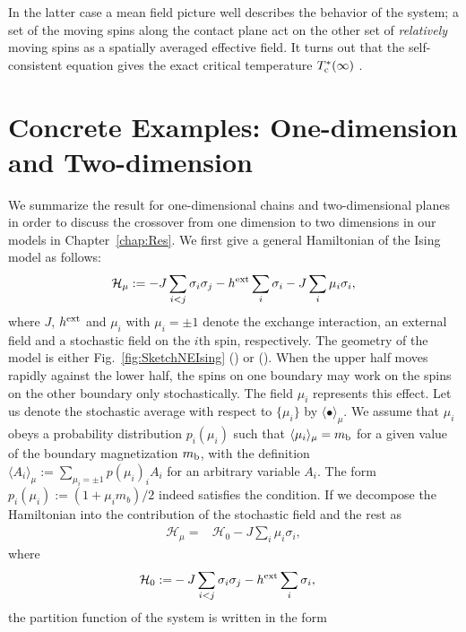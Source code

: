 In the latter case a mean field picture \cite{Hucht2009b} well describes the behavior of the system; a set of the moving spins along the contact plane act on the other set of \textit{relatively} moving spins as a spatially averaged effective field. It turns out that the self-consistent equation gives the exact critical temperature $T^{*}_{\rm c}(\infty)$ \cite{Hucht2009b}.

\section{Concrete Examples: One-dimension and Two-dimension}

We summarize the result for one-dimensional chains and two-dimensional planes in order to discuss the crossover from one dimension to two dimensions in our models in Chapter~\ref{chap:Res}. We first give a general Hamiltonian of the Ising model as follows:
\begin{align}
\mathcal{H}_{\mu}:=-J\sum_{i<j}\sigma_{i}\sigma_{j}-h^{\rm ext}\sum_{i}\sigma_{i}-J\sum_{i}\mu_{i}\sigma_{i},
\end{align}
where $J$, $h^{\rm ext}$ and $\mu_{i}$ with $\mu_{i}=\pm 1$ denote the exchange interaction, an external field and a stochastic field on the $i$th spin, respectively. The geometry of the model is either Fig.~\ref{fig:SketchNEIsing} () or (). When the upper half moves rapidly against the lower half, the spins on one boundary may work on the spins on the other boundary only stochastically. The field $\mu_{i}$ represents this effect. Let us denote the stochastic average with respect to $\{\mu_{i}\}$ by $\langle\bullet\rangle_{\mu}$. We assume that $\mu_{i}$ obeys a probability distribution $p_{i}(\mu_{i})$ such that $\langle\mu_{i}\rangle_{\mu}=m_{\rm b}$ for a given value of the boundary magnetization $m_{\rm b}$, with the definition $\langle A_{i}\rangle_{\mu}:=\sum_{\mu_{i}=\pm 1}p(\mu_{i})_{i}A_{i}$ for an arbitrary variable $A_{i}$. The form $p_{i}(\mu_{i}):=(1+\mu_{i}m_{b})/2$ indeed satisfies the condition. If we decompose the Hamiltonian into the contribution of the stochastic field and the rest as
\begin{align}
\mathcal{H}_{\mu}=& \mathcal{H}_{0} - J\sum_{i}\mu_{i}\sigma_{i},
\end{align}
where
\begin{align}
\mathcal{H}_{0}:=&-J\sum_{i<j}\sigma_{i}\sigma_{j}-h^{\rm ext}\sum_{i}\sigma_{i},
\end{align}
the partition function of the system is written in the form
